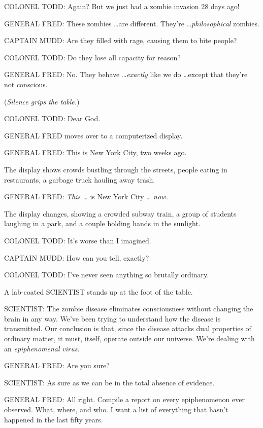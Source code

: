 {
 COLONEL TODD: Again? But we just had a zombie invasion 28 days
ago!}

{
 GENERAL FRED: These zombies \ldots are different.
They're \ldots \textit{philosophical} zombies.}

{
 CAPTAIN MUDD: Are they filled with rage, causing them to bite
people?}

{
 COLONEL TODD: Do they lose all capacity for reason?}

{
 GENERAL FRED: No. They behave \ldots \textit{exactly} like we do
\ldots except that they're not conscious.}

{
 (\textit{Silence grips the table.})}

{
 COLONEL TODD: Dear God.}

{
 GENERAL FRED moves over to a computerized display.}

{
 GENERAL FRED: This is New York City, two weeks ago.}

{
 The display shows crowds bustling through the streets, people
eating in restaurants, a garbage truck hauling away trash.}

{
 GENERAL FRED: \textit{This \ldots} is New York City \ldots
\textit{now.}}

{
 The display changes, showing a crowded subway train, a group of
students laughing in a park, and a couple holding hands in the
sunlight.}

{
 COLONEL TODD: It's worse than I imagined.}

{
 CAPTAIN MUDD: How can you tell, exactly?}

{
 COLONEL TODD: I've never seen anything so brutally
ordinary.}

{
 A lab-coated SCIENTIST stands up at the foot of the table.}

{
 SCIENTIST: The zombie disease eliminates consciousness without
changing the brain in any way. We've been trying to
understand how the disease is transmitted. Our conclusion is that,
since the disease attacks dual properties of ordinary matter, it must,
itself, operate outside our universe. We're dealing
with an \textit{epiphenomenal virus}.}

{
 GENERAL FRED: Are you sure?}

{
 SCIENTIST: As sure as we can be in the total absence of evidence.}

{
 GENERAL FRED: All right. Compile a report on every epiphenomenon
ever observed. What, where, and who. I want a list of everything that
hasn't happened in the last fifty years.}

